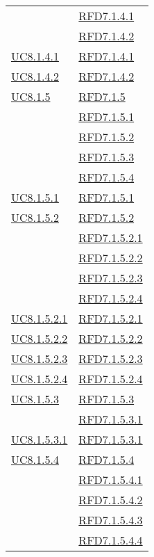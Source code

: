 \begin{longtable}{|>{\centering}m{5cm}|m{5cm}<{\centering}|}
& \hyperlink{RFD7.1.4.1}{RFD7.1.4.1}\\
& \hyperlink{RFD7.1.4.2}{RFD7.1.4.2}\\ \hline
\hyperref[UC8.1.4.1]{UC8.1.4.1} & \hyperlink{RFD7.1.4.1}{RFD7.1.4.1}\\ \hline
\hyperref[UC8.1.4.2]{UC8.1.4.2} & \hyperlink{RFD7.1.4.2}{RFD7.1.4.2}\\ \hline
\hyperref[UC8.1.5]{UC8.1.5} & \hyperlink{RFD7.1.5}{RFD7.1.5}\\
& \hyperlink{RFD7.1.5.1}{RFD7.1.5.1}\\
& \hyperlink{RFD7.1.5.2}{RFD7.1.5.2}\\
& \hyperlink{RFD7.1.5.3}{RFD7.1.5.3}\\
& \hyperlink{RFD7.1.5.4}{RFD7.1.5.4}\\ \hline
\hyperref[UC8.1.5.1]{UC8.1.5.1} & \hyperlink{RFD7.1.5.1}{RFD7.1.5.1}\\ \hline
\hyperref[UC8.1.5.2]{UC8.1.5.2} & \hyperlink{RFD7.1.5.2}{RFD7.1.5.2}\\
& \hyperlink{RFD7.1.5.2.1}{RFD7.1.5.2.1}\\
& \hyperlink{RFD7.1.5.2.2}{RFD7.1.5.2.2}\\
& \hyperlink{RFD7.1.5.2.3}{RFD7.1.5.2.3}\\
& \hyperlink{RFD7.1.5.2.4}{RFD7.1.5.2.4}\\ \hline
\hyperref[UC8.1.5.2.1]{UC8.1.5.2.1} & \hyperlink{RFD7.1.5.2.1}{RFD7.1.5.2.1}\\ \hline
\hyperref[UC8.1.5.2.2]{UC8.1.5.2.2} & \hyperlink{RFD7.1.5.2.2}{RFD7.1.5.2.2}\\ \hline
\hyperref[UC8.1.5.2.3]{UC8.1.5.2.3} & \hyperlink{RFD7.1.5.2.3}{RFD7.1.5.2.3}\\ \hline
\hyperref[UC8.1.5.2.4]{UC8.1.5.2.4} & \hyperlink{RFD7.1.5.2.4}{RFD7.1.5.2.4}\\ \hline
\hyperref[UC8.1.5.3]{UC8.1.5.3} & \hyperlink{RFD7.1.5.3}{RFD7.1.5.3}\\
& \hyperlink{RFD7.1.5.3.1}{RFD7.1.5.3.1}\\ \hline
\hyperref[UC8.1.5.3.1]{UC8.1.5.3.1} & \hyperlink{RFD7.1.5.3.1}{RFD7.1.5.3.1}\\ \hline
\hyperref[UC8.1.5.4]{UC8.1.5.4} & \hyperlink{RFD7.1.5.4}{RFD7.1.5.4}\\
& \hyperlink{RFD7.1.5.4.1}{RFD7.1.5.4.1}\\
& \hyperlink{RFD7.1.5.4.2}{RFD7.1.5.4.2}\\
& \hyperlink{RFD7.1.5.4.3}{RFD7.1.5.4.3}\\
& \hyperlink{RFD7.1.5.4.4}{RFD7.1.5.4.4}\\ \hline

\end{longtable}
